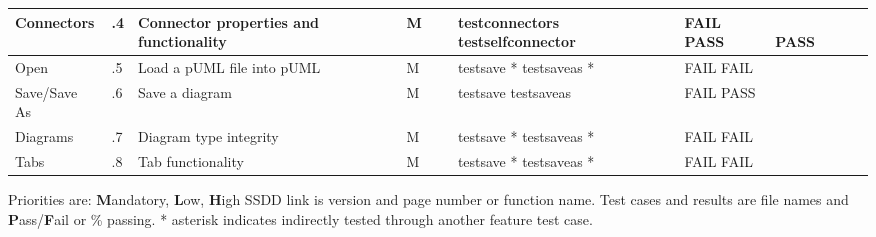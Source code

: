 \documentclass[twoside,letterpaper]{article}
\begin{document}
\begin{landscape}
\begin{flushleft}
\begin{supertabular}[c]{|
                        m{0.9in}|m{0.4in}|m{2.0in}|
                        m{0.4in}|m{0.5in}|m{1.0in}|
                        m{1.0in}|m{1.0in}|c|
                       }
  Connectors
  & .4
  & Connector properties and functionality
  & \centering M 
  & ~ 
  & testconnectors\newline 
    testselfconnector
  & FAIL \newline
    PASS
  & ~ \newline
    PASS
  & ~ \newline
    ~
\\\hline

  Open
  & .5
  & Load a pUML file into pUML 
  & \centering M 
  & ~ 
  & testsave *\newline
    testsaveas *
  & FAIL \newline
    FAIL 
  & ~ \newline
    ~
  & ~ \newline
    ~
\\\hline

  Save/Save As
  & .6
  & Save a diagram 
  & \centering M 
  & ~ 
  & testsave \newline 
    testsaveas
  & FAIL \newline
    PASS
  & ~ \newline
    ~
  & ~ \newline
    ~
\\\hline

  Diagrams
  & .7
  & Diagram type integrity 
  & \centering M 
  & ~ 
  & testsave *\newline 
    testsaveas *
  & FAIL \newline
    FAIL
  & ~ \newline
    ~
  & ~ \newline
    ~
\\\hline

  Tabs
  & .8
  & Tab functionality 
  & \centering M 
  & ~ 
  & testsave *\newline 
    testsaveas *
  & FAIL \newline
    FAIL
  & ~ \newline
    ~
  & ~ \newline
    ~
\\\hline

\end{supertabular}
\end{flushleft}

{Priorities are: \textbf{M}andatory, \textbf{L}ow, \textbf{H}igh} \newline
{SSDD link is version and page number or function name.} \newline
{Test cases and results are file names and \textbf{P}ass/\textbf  {F}ail or \% passing.} \newline
{* asterisk indicates indirectly tested through another feature test case.}

\bigskip

\end{landscape}
\end{document}
